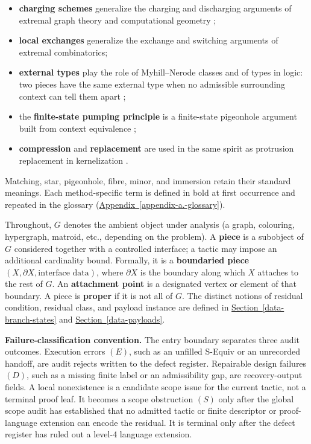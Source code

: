 \documentclass[
  11pt,
]{article}
\providecommand{\tightlist}{%
  \setlength{\itemsep}{0pt}\setlength{\parskip}{0pt}}
\theoremstyle{definition}
\newcommand{\secref}[1]{\hyperref[#1]{Section~\ref*{#1}}}
\newcommand{\appref}[1]{\hyperref[#1]{Appendix~\ref*{#1}}}
\begin{document}
\begin{itemize}
\tightlist
\item
  \textbf{charging schemes} generalize the charging and discharging
  arguments of extremal graph theory and computational geometry
  \citep{appel-haken-1977-discharging, appel-haken-koch-1977-reducibility, cranston-west-2017-discharging};
\item
  \textbf{local exchanges} generalize the exchange and switching
  arguments of extremal combinatorics;
\item
  \textbf{external types} play the role of Myhill--Nerode classes and of
  types in logic: two pieces have the same external type when no
  admissible surrounding context can tell them apart
  \citep{myhill-1957-automata, nerode-1958-linear, courcelle-1990-mso-graphs, courcelle-engelfriet-2012-graph-structure};
\item
  the \textbf{finite-state pumping principle} is a finite-state
  pigeonhole argument built from context equivalence
  \citep{myhill-1957-automata, nerode-1958-linear};
\item
  \textbf{compression} and \textbf{replacement} are used in the same
  spirit as protrusion replacement in kernelization
  \citep{bodlaender-etal-2009-meta-kernelization, kim-etal-2012-protrusion, garnero-etal-2013-explicit-kernels, jansen-wulms-2016-lower-bounds}.
\end{itemize}

Matching, star, pigeonhole, fibre, minor, and immersion retain their
standard meanings. Each method-specific term is defined in bold at first
occurrence and repeated in the glossary
(\appref{appendix-a.-glossary}).

Throughout, \(G\) denotes the ambient object under analysis (a graph,
colouring, hypergraph, matroid, etc., depending on the problem). A
\textbf{piece} is a subobject of \(G\) considered together with a
controlled interface; a tactic may impose an additional cardinality
bound. Formally, it is a \textbf{boundaried piece}
\((X,\partial X, \text{interface data})\), where \(\partial X\) is the
boundary along which \(X\) attaches to the rest of \(G\). An
\textbf{attachment point} is a designated vertex or element of that
boundary. A piece is \textbf{proper} if it is not all of \(G\). The
distinct notions of residual condition, residual class, and payload
instance are defined in \secref{data-branch-states} and
\secref{data-payloads}.

\textbf{Failure-classification convention.} The entry boundary separates
three audit outcomes. Execution errors \((E)\), such as an
unfilled S-Equiv or an unrecorded handoff, are audit rejects written to
the defect register. Repairable design failures \((D)\), such as a
missing finite label or an admissibility gap, are recovery-output
fields. A local nonexistence is a candidate scope issue for the current
tactic, not a terminal proof leaf. It becomes a scope obstruction \((S)\)
only after the global scope audit has established that no admitted tactic or
finite descriptor or proof-language extension can encode the residual. It is
terminal only after the defect register has ruled out a level-4 language
extension.
\end{document}
